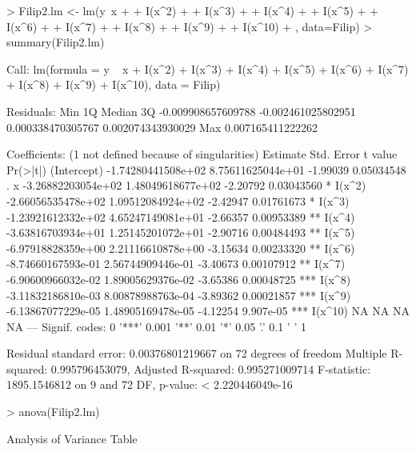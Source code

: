 \documentclass[10pt]{article}
\begin{document}
\begin{Schunk}
\begin{Sinput}
> Filip2.lm <- lm(y~x + 
+                    I(x^2) +
+                    I(x^3) +
+                    I(x^4) +
+                    I(x^5) +
+                    I(x^6) +
+                    I(x^7) +
+                    I(x^8) +
+                    I(x^9) +
+                    I(x^10) 
+                 , data=Filip)
> summary(Filip2.lm)
\end{Sinput}
\begin{Soutput}
Call:
lm(formula = y ~ x + I(x^2) + I(x^3) + I(x^4) + I(x^5) + I(x^6) + 
    I(x^7) + I(x^8) + I(x^9) + I(x^10), data = Filip)

Residuals:
               Min                 1Q             Median                 3Q 
-0.009908657609788 -0.002461025802951  0.000338470305767  0.002074343930029 
               Max 
 0.007165411222262 

Coefficients: (1 not defined because of singularities)
                      Estimate         Std. Error  t value   Pr(>|t|)    
(Intercept) -1.74280441508e+02  8.75611625044e+01 -1.99039 0.05034548 .  
x           -3.26882203054e+02  1.48049618677e+02 -2.20792 0.03043560 *  
I(x^2)      -2.66056535478e+02  1.09512084924e+02 -2.42947 0.01761673 *  
I(x^3)      -1.23921612332e+02  4.65247149081e+01 -2.66357 0.00953389 ** 
I(x^4)      -3.63816703934e+01  1.25145201072e+01 -2.90716 0.00484493 ** 
I(x^5)      -6.97918828359e+00  2.21116610878e+00 -3.15634 0.00233320 ** 
I(x^6)      -8.74660167593e-01  2.56744909446e-01 -3.40673 0.00107912 ** 
I(x^7)      -6.90600966032e-02  1.89005629376e-02 -3.65386 0.00048725 ***
I(x^8)      -3.11832186810e-03  8.00878988763e-04 -3.89362 0.00021857 ***
I(x^9)      -6.13867077229e-05  1.48905169478e-05 -4.12254  9.907e-05 ***
I(x^10)                     NA                 NA       NA         NA    
---
Signif. codes:  0 '***' 0.001 '**' 0.01 '*' 0.05 '.' 0.1 ' ' 1

Residual standard error: 0.00376801219667 on 72 degrees of freedom
Multiple R-squared:  0.995796453079,	Adjusted R-squared:  0.995271009714 
F-statistic:  1895.1546812 on 9 and 72 DF,  p-value: < 2.220446049e-16
\end{Soutput}
\begin{Sinput}
> anova(Filip2.lm)
\end{Sinput}
\begin{Soutput}
Analysis of Variance Table


\end{Soutput}
\end{Schunk}
\end{document}
